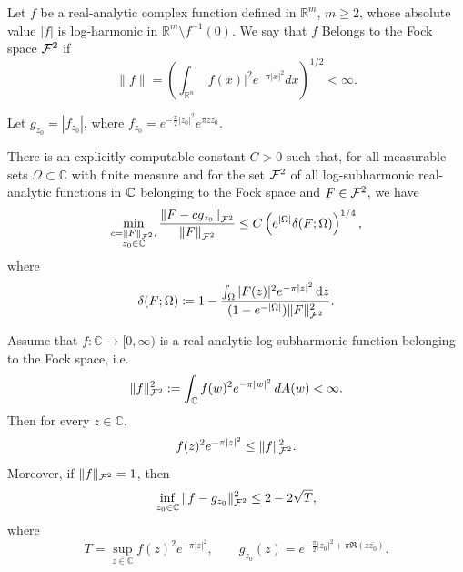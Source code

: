 \documentclass[a4paper,10pt]{amsart}
\newcommand{\Fock}{\mcalF^2}
\newcommand{\Fnorm}[1]{\norm{#1}_{\Fock}}
\newcommand{\Om}{\Omega}
\begin{document}
\begin{numdefn}
Let $f$ be a real-analytic complex function defined in $\mathbb{R}^m$, $m\ge 2$, whose absolute value $|f|$ is log-harmonic in $\mathbb{R}^m\setminus f^{-1}(0)$.
We say that $f$ Belongs to the Fock space $\Fock$ if $$\|f\|=\left(\int_{\mathbb{R}^n}|f(x)|^2 e^{-\pi |x|^2} dx\right)^{1/2}<\infty.$$
\end{numdefn}

Let $g_{z_0}=|f_{z_0}|$, where $f_{z_0}=e^{-\frac{\pi}{2}|z_0|^2}e^{\pi z\overline{z_0}}.$
\begin{numthm}\label{thm:StabilityFockSpace}
    There is an explicitly computable constant $C>0$ such that, for all  measurable sets $\Om \subset \mathbb{C}$ with finite measure and for the set $\Fock$ of all log-subharmonic  real-analytic functions in $\mathbb{C}$ belonging to the Fock space and $F\in \Fock$, we have
    \begin{equation}\label{eqn:StabilityFunctionFock}
        \min_{\substack{c=\|F\|_{\Fock},\\ z_0\in \C}} \frac{\Fnorm{F-cg_{z_0}}}{\Fnorm{F}} \leq C
        \left(e^{\vol{\Om}} \delta(F;\Om)\right)^{1/4},
    \end{equation}
where
\begin{equation}
\label{defdeltaFO}
\delta(F;\Omega) \coloneqq 1-\frac{\int_\Omega |F(z)|^2 e^{-\pi |z|^2}\diff z}
{(1-e^{-|\Omega|})\Vert F\Vert_{\Fock}^2}.
\end{equation}

\end{numthm}
\begin{numlemma}\label{ulqin}
Assume that $f:\mathbb C\to[0,\infty)$ is a real-analytic log-subharmonic function
belonging to the Fock space, i.e.
\[
\|f\|_{\Fock}^2:=\int_{\mathbb C} f(w)^2 e^{-\pi |w|^2}\,dA(w)<\infty.
\]
Then for every $z\in\mathbb C$,
\[
f(z)^2e^{-\pi |z|^2}\le \|f\|_{\Fock}^2.
\]
Moreover, if $\|f\|_{\Fock}=1$, then
\[
\inf_{z_0\in \mathbb C}\|f-g_{z_0}\|_{\Fock}^2\le 2-2 \sqrt{T},
\]
where
\[
T=\sup_{z\in \mathbb C} f(z)^2e^{-\pi |z|^2},
\qquad
g_{z_0}(z)=e^{-\frac{\pi}{2}|z_0|^2+\pi \Re(z\overline{z_0})}.
\]
\end{numlemma}
\end{document}
